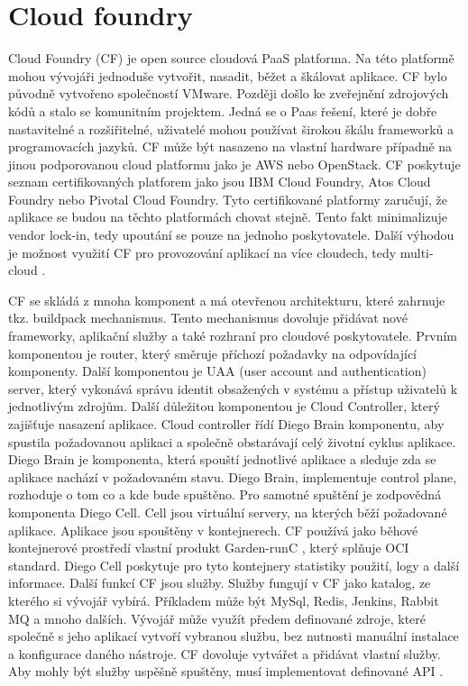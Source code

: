 \section{Cloud foundry}
Cloud Foundry (CF) je open source cloudová PaaS platforma. Na této platformě mohou vývojáři jednoduše vytvořit, nasadit, běžet a škálovat aplikace. CF bylo původně vytvořeno společností VMware. Později došlo ke zveřejnění zdrojových kódů a stalo se komunitním projektem. Jedná se o Paas řešení, které je dobře nastavitelné a rozšiřitelné, uživatelé mohou používat širokou škálu frameworků a programovacích jazyků. CF může být nasazeno na vlastní hardware případně na jinou podporovanou cloud platformu jako je AWS nebo OpenStack. CF poskytuje seznam certifikovaných platforem jako jsou IBM Cloud Foundry, Atos Cloud Foundry nebo Pivotal Cloud Foundry. Tyto certifikované platformy zaručují, že aplikace se budou na těchto platformách chovat stejně. Tento fakt minimalizuje vendor lock-in, tedy upoutání se pouze na jednoho poskytovatele. Další výhodou je možnost využití CF pro provozování aplikací na více cloudech, tedy multi-cloud \cite{cf}.\par
CF se skládá z mnoha komponent a má otevřenou architekturu, které zahrnuje tkz. buildpack mechanismus. Tento mechanismus dovoluje přidávat nové frameworky, aplikační služby a také rozhraní pro cloudové poskytovatele. Prvním komponentou je router, který směruje příchozí požadavky na odpovídající komponenty. Další komponentou je UAA (user account and authentication) server, který vykonává správu identit obsažených v systému a přístup uživatelů k jednotlivým zdrojům. Další důležitou komponentou je Cloud Controller, který zajišťuje nasazení aplikace. Cloud controller řídí Diego Brain komponentu, aby spustila požadovanou aplikaci a společně obstarávají celý životní cyklus aplikace. Diego Brain je komponenta, která spouští jednotlivé aplikace a sleduje zda se aplikace nachází v požadovaném stavu. Diego Brain, implementuje control plane, rozhoduje o tom co a kde bude spuštěno. Pro samotné spuštění je zodpovědná komponenta Diego Cell. Cell jsou virtuální servery, na kterých běží požadované aplikace. Aplikace jsou spouštěny v kontejnerech. CF používá jako běhové kontejnerové prostředí vlastní produkt Garden-runC \cite{garden}, který splňuje OCI standard. Diego Cell poskytuje pro tyto kontejnery statistiky použití, logy a další informace. Další funkcí CF jsou služby. Služby fungují v CF jako katalog, ze kterého si vývojář vybírá. Příkladem může být MySql, Redis, Jenkins, Rabbit MQ a mnoho dalších. Vývojář může využít předem definované zdroje, které společně s jeho aplikací vytvoří vybranou službu, bez nutnosti manuální instalace a konfigurace daného nástroje. CF dovoluje vytvářet a přidávat vlastní služby. Aby mohly být služby uspěšně spuštěny, musí implementovat definované API \cite{pivotal}. \par
